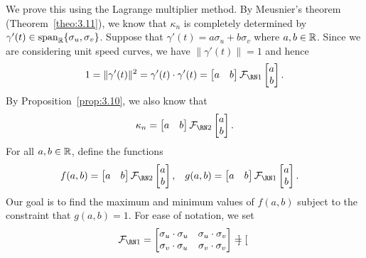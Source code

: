 \begin{pf}
    We prove this using the Lagrange multiplier method. By Meusnier's theorem 
    (Theorem~\ref{theo:3.11}), we know that $\kappa_n$ is completely determined by 
    $\gamma'(t) \in \operatorname{span}_{\mathbb{R}}\{\sigma_u, \sigma_v\}$. Suppose that 
    $\gamma'(t) = a\sigma_u + b\sigma_v$
    where $a, b \in \mathbb{R}$. Since we are considering unit speed curves, we have 
    $\|\gamma'(t)\| = 1$ and hence 
    \[ 1 = \|\gamma'(t)\|^2 = \gamma'(t) \cdot \gamma'(t) 
    = \begin{bmatrix}
        a & b 
    \end{bmatrix} \FFF \begin{bmatrix}
        a \\ b
    \end{bmatrix}. \] 
    By Proposition~\ref{prop:3.10}, we also know that 
    \[ \kappa_n = \begin{bmatrix}
        a & b 
    \end{bmatrix} \SFF \begin{bmatrix}
        a \\ b 
    \end{bmatrix}. \] 
    For all $a, b \in \mathbb{R}$, define the functions 
    \begin{align*}
        f(a, b) &= \begin{bmatrix}
            a & b 
        \end{bmatrix} \SFF \begin{bmatrix}
            a \\ b 
        \end{bmatrix}, & 
        g(a, b) &= \begin{bmatrix}
            a & b 
        \end{bmatrix} \FFF \begin{bmatrix}
            a \\ b 
        \end{bmatrix}.
    \end{align*}
    Our goal is to find the maximum and minimum values of $f(a, b)$ 
    subject to the constraint that $g(a, b) = 1$. 
    For ease of notation, we set 
    \begin{align*}
        \FFF &= \begin{bmatrix} 
            \sigma_u \cdot \sigma_u & \sigma_u \cdot \sigma_v \\ 
            \sigma_v \cdot \sigma_u & \sigma_v \cdot \sigma_v 
        \end{bmatrix} = \begin{bmatrix}

\end{bmatrix}
\end{align*}
\end{pf}
